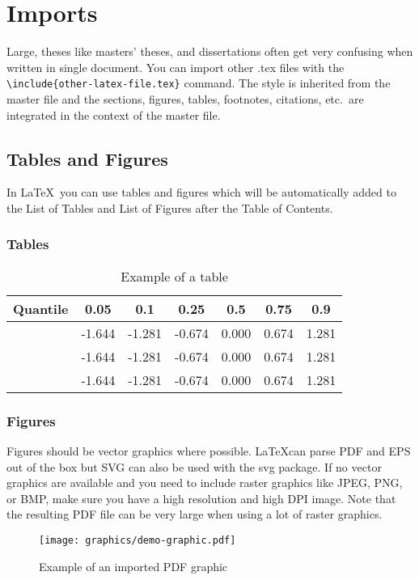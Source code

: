 \chapter{Imports}

Large, theses like masters' theses, and dissertations often get very confusing when written in single document. You can import other .tex files with the \texttt{\textbackslash{}include\{other-latex-file.tex\}} command. The style is inherited from the master file and the sections, figures, tables, footnotes, citations, etc.\ are integrated in the context of the master file.

\section{Tables and Figures}
In \LaTeX\ you can use tables and figures which will be automatically added to the List of Tables and List of Figures after the Table of Contents.

\subsection{Tables}

\begin{table}[ht]
\begin{center}
	\begin{tabu}{
		X
		S[table-format=-1.3]
		S[table-format=-1.3]
		S[table-format=-1.3]
		S[table-format=-1.3]
		S[table-format=-1.3]
		S[table-format=-1.3]}
		\toprule
		{Quantile} & 0.05 & 0.1 & 0.25 & 0.5 & 0.75 & 0.9 \\
		\midrule
		 & -1.644 & -1.281 & -0.674 & 0.000 & 0.674 & 1.281 \\
		 & -1.644 & -1.281 & -0.674 & 0.000 & 0.674 & 1.281 \\
		 & -1.644 & -1.281 & -0.674 & 0.000 & 0.674 & 1.281 \\
		\bottomrule
	\end{tabu}
	\caption{Example of a table}
	\label{table:1}
\end{center}
\end{table}

\subsection{Figures}

Figures should be vector graphics where possible. \LaTeX can parse PDF and EPS out of the box but SVG can also be used with the svg package. If no vector graphics are available and you need to include raster graphics like JPEG, PNG, or BMP, make sure you have a high resolution and high DPI image. Note that the resulting PDF file can be very large when using a lot of raster graphics.


\begin{figure}[ht]
	\centering
	\texttt{[image: graphics/demo-graphic.pdf]}
	\caption{Example of an imported PDF graphic}
	\label{figure:1}
\end{figure}
